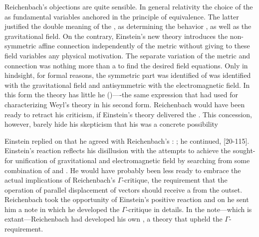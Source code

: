 \documentclass[draft]{article}
\newcommand{\WT}{Weyl's theory\xspace}
\begin{document}
Reichenbach's objections are quite sensible. In general relativity the choice of the \gmn as fundamental variables anchored in the principle of equivalence. The latter justified the double meaning of the \gmn, as determining the behavior \rac, as well as the gravitational field. On the contrary, Einstein's new theory introduces the non-symmetric affine connection \Gtmn independently of the metric \gmn without giving to these field variables any physical motivation. The separate variation of the metric and connection was nothing more than a  to find the desired field equations. Only in hindsight, for formal reasons, the symmetric part was identified of \gmn was identified with the gravitational field and antisymmetric with the electromagnetic field. In this form the theory has little he  ()----the same expression that \citet[367]{Reichenbach1921} had used for characterizing \WT in his second form. Reichenbach would have been ready to retract his criticism, if Einstein's theory delivered the . This concession, however, barely hide his skepticism that his was a concrete possibility 

Einstein replied on   that he agreed with Reichenbach's : ;  he continued,  [20-115]. Einstein's reaction reflects his disillusion with the attempts to achieve the sought-for unification of gravitational and electromagnetic field by searching from some combination of \Gtmn and \gmn. He would have probably been less ready to embrace the actual implications of Reichenbach's $\Gamma$-critique, the requirement that the operation of parallel displacement of vectors should receive a  from the outset. Reichenbach took the opportunity of Einstein's positive reaction and on  he sent him a note in which he developed the $\Gamma$-critique in details. In the note---which is extant---Reichenbach had developed his own \uft, a theory that upheld the $\Gamma$-requirement.
\end{document}
